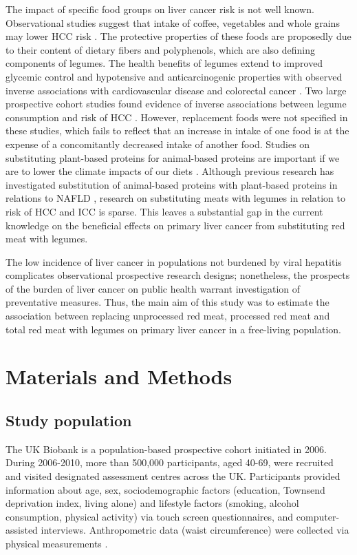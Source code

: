 \documentclass[nutrients,article,submit,moreauthors,pdftex]{Definitions/mdpi}
\begin{document}
The impact of specific food groups on liver cancer risk is not well
known. Observational studies suggest that intake of coffee, vegetables
and whole grains may lower HCC risk \citep{zhang2013, yang2014, Liu2021, Bhurwal2020}. The protective properties of these foods are proposedly
due to their content of dietary fibers and polyphenols, which are also
defining components of legumes. The health benefits of legumes extend to
improved glycemic control and hypotensive and anticarcinogenic
properties with observed inverse associations with cardiovascular
disease and colorectal cancer \citep{viguiliouk2019, jin2022}. Two large
prospective cohort studies found evidence of inverse associations
between legume consumption and risk of HCC \citep{zhang2013, Liu2021}.
However, replacement foods were not specified in these studies, which
fails to reflect that an increase in intake of one food is at the
expense of a concomitantly decreased intake of another food. Studies on
substituting plant-based proteins for animal-based proteins are
important if we are to lower the climate impacts of our diets \citep{RN71}.
Although previous research has investigated substitution of animal-based
proteins with plant-based proteins in relations to NAFLD \citep{Zhang2023},
research on substituting meats with legumes in relation to risk of HCC
and ICC is sparse. This leaves a substantial gap in the current
knowledge on the beneficial effects on primary liver cancer from
substituting red meat with legumes.

The low incidence of liver cancer in populations not burdened by viral
hepatitis complicates observational prospective research designs;
nonetheless, the prospects of the burden of liver cancer on public
health warrant investigation of preventative measures. Thus, the main
aim of this study was to estimate the association between replacing
unprocessed red meat, processed red meat and total red meat with legumes
on primary liver cancer in a free-living population.

\hypertarget{sec2}{%
\section{Materials and Methods}\label{sec2}}

\hypertarget{subsec1}{%
\subsection{Study population}\label{subsec1}}

The UK Biobank is a population-based prospective cohort initiated in
2006. \citep{sudlow2015} During 2006-2010, more than 500,000 participants,
aged 40-69, were recruited and visited designated assessment centres
across the UK. Participants provided information about age, sex,
sociodemographic factors (education, Townsend deprivation index, living
alone) and lifestyle factors (smoking, alcohol consumption, physical
activity) via touch screen questionnaires, and computer-assisted
interviews. Anthropometric data (waist circumference) were collected via
physical measurements \citep{RN113}.
\end{document}
